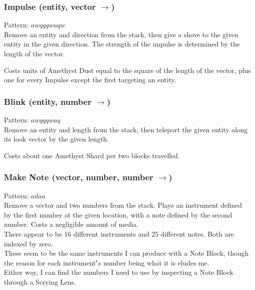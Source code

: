\documentclass[12pt]{article}
\begin{document}
\subsubsection*{Impulse (entity, vector $\rightarrow$)}

    Pattern: $awqqqwaqw$\\
      Remove an entity and direction from the stack, then give a shove to the given entity in the given direction. The strength of the impulse is determined by the length of the vector.

Costs units of Amethyst Dust equal to the square of the length of the vector, plus one for every Impulse except the first targeting an entity.\\


  \label{sec: patterns/spells/basic@hexcasting:blink}
\subsubsection*{Blink (entity, number $\rightarrow$)}

    Pattern: $awqqqwaq$\\
      Remove an entity and length from the stack, then teleport the given entity along its look vector by the given length.

Costs about one Amethyst Shard per two blocks travelled.\\


  \label{sec: patterns/spells/basic@hexcasting:beep}
\subsubsection*{Make Note (vector, number, number $\rightarrow$)}

    Pattern: $adaa$\\
      Remove a vector and two numbers from the stack. Plays an instrument defined by the first number at the given location, with a note defined by the second number. Costs a negligible amount of media.\\


  
    There appear to be 16 different instruments and 25 different notes. Both are indexed by zero.\\These seem to be the same instruments I can produce with a Note Block, though the reason for each instrument$\rq$s number being what it is eludes me.\\Either way, I can find the numbers I need to use by inspecting a Note Block through a Scrying Lens.\\
\end{document}
